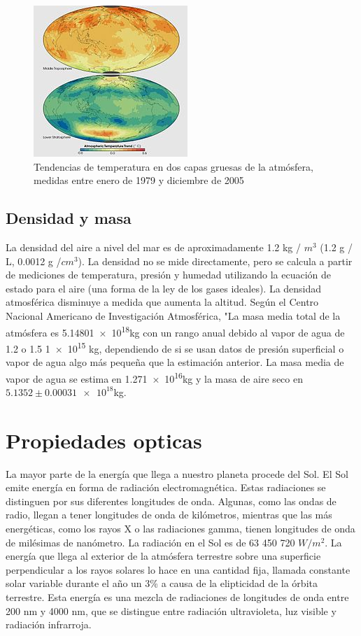 \documentclass{article}
\begin{document}
\begin{figure}
  \centering
  \includegraphics[scale=0.35]{temperatura.jpg}
  \caption{Tendencias de temperatura en dos capas gruesas de la atmósfera, medidas entre enero de 1979 y diciembre de 2005  }
  \label{fig:Temperatura}
\end{figure}

\subsection{Densidad y masa}
La densidad del aire a nivel del mar es de aproximadamente 1.2 kg / $m^3$ (1.2 g / L, 0.0012 g /$cm^3$).
La densidad no se mide directamente, pero se calcula a partir de mediciones de temperatura, presión y humedad utilizando la ecuación de estado para el aire (una forma de la ley de los gases ideales). La densidad atmosférica disminuye a medida que aumenta la altitud.
\newline
Según el Centro Nacional Americano de Investigación Atmosférica, "La masa media total de la atmósfera es 5.1480\num{1e18}kg con un rango anual debido al vapor de agua de 1.2 o 1.5 \num{1e15} kg, dependiendo de si se usan datos de presión superficial o vapor de agua algo más pequeña que la estimación anterior. La masa media de vapor de agua se estima en 1.27\num{1e16}kg y la masa de aire seco en $5.1352 \pm 0.0003\num{1e18}$kg.

\section{Propiedades opticas}
La mayor parte de la energía que llega a nuestro planeta procede del Sol. El Sol emite energía en forma de radiación electromagnética. Estas radiaciones se distinguen por sus diferentes longitudes de onda. Algunas, como las ondas de radio, llegan a tener longitudes de onda de kilómetros, mientras que las más energéticas, como los rayos X o las radiaciones gamma, tienen longitudes de onda de milésimas de nanómetro.
\newline
La radiación en el Sol es de 63 450 720 ${W/m^2}$. La energía que llega al exterior de la atmósfera terrestre sobre una superficie perpendicular a los rayos solares lo hace en una cantidad fija, llamada constante solar  variable durante el año un 3\% a causa de la elipticidad de la órbita terrestre.
\newline
Esta energía es una mezcla de radiaciones de longitudes de onda entre 200 nm y 4000 nm, que se distingue entre radiación ultravioleta, luz visible y radiación infrarroja.
\end{document}
